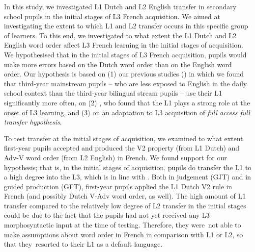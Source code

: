 \documentclass[output=paper]{langsci/langscibook}
\begin{document}
In this study, we investigated L1 Dutch and L2 English transfer in secondary school pupils in the initial stages of L3 French acquisition. We aimed at investigating the extent to which L1 and L2 transfer occurs in this specific group of learners. To this end, we investigated to what extent the L1 Dutch and L2 English word order affect L3 French learning in the initial stages of acquisition. We hypothesised that in the initial stages of L3 French acquisition, pupils would make more errors based on the Dutch word order than on the English word order. Our hypothesis is based on (1) our previous studies (\citealt{StadtEtAl2016, StadtEtAl2018Exposure}) in which we found that third-year mainstream pupils – who are less exposed to English in the daily school context than the third-year bilingual stream pupils – use their L1 significantly more often, on (2) \citet{Hermas2010, Hermas2014Morphosyntax, Hermas2014Relatives}, who found that the L1 plays a strong role at the onset of L3 learning, and (3) on an adaptation to L3 acquisition of  \textit{full access full transfer hypothesis}.

To test transfer at the initial stages of acquisition, we examined to what extent first-year pupils accepted and produced the V2 property (from L1 Dutch) and Adv-V word order (from L2 English) in French. We found support for our hypothesis; that is, in the initial stages of acquisition, pupils do transfer the L1 to a high degree into the L3, which is in line with \citet{Hermas2010, Hermas2014Morphosyntax, Hermas2014Relatives}. Both in judgement (GJT) and in guided production (GFT), first-year pupils applied the L1 Dutch V2 rule in French (and possibly Dutch V-Adv word order, as well). The high amount of L1 transfer compared to the relatively low degree of L2 transfer in the initial stages could be due to the fact that the pupils had not yet received any L3 morphosyntactic input at the time of testing. Therefore, they were~not able to make assumptions about word order in French in comparison with L1 or L2, so that they~resorted to their L1 as a default language.
\end{document}
